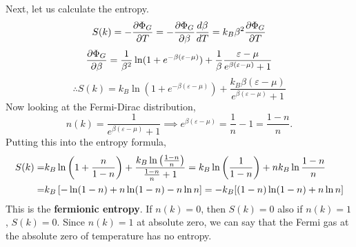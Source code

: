         Next, let us calculate the entropy.
        \begin{equation}
            S(k) = - \frac{\partial \Phi_G}{\partial T} = -\frac{\partial \Phi_G}{\partial \beta}\frac{d\beta}{dT}=k_B\beta^2 \frac{\partial \Phi_G}{\partial T}
        \end{equation}
        \begin{equation}
            \frac{\partial \Phi_G}{\partial \beta}=\frac{1}{\beta^2}\ln(1+e^{-\beta(\varepsilon-\mu)})+ \frac{1}{\beta}\frac{\varepsilon-\mu}{e^{\beta(\varepsilon-\mu)}+1}
        \end{equation}
        \begin{equation}
            \therefore S(k) = k_B\ln(1+e^{-\beta(\varepsilon-\mu)})+\frac{k_B\beta(\varepsilon-\mu)}{e^{\beta(\varepsilon-\mu)}+1}
        \end{equation}
        Now looking at the Fermi-Dirac distribution,
        \begin{equation}
            n(k) = \frac{1}{e^{\beta(\varepsilon-\mu)}+1}\implies e^{\beta(\varepsilon-\mu)}=\frac{1}{n}-1=\frac{1-n}{n}.
        \end{equation}
        Putting this into the entropy formula,
        \begin{align}
            S(k) =& k_B\ln\left( 1+\frac{n}{1-n} \right)+\frac{k_B\ln\left( \frac{1-n}{n} \right)}{\frac{1-n}{n}+1}=k_B\ln\left( \frac{1}{1-n} \right)+nk_B\ln\frac{1-n}{n} \notag\\
                =& k_B\left[ -\ln(1-n)+n\ln(1-n)-n\ln n \right] = -k_B[(1-n)\ln(1-n)+n\ln n]
        \end{align}
        This is the \textbf{fermionic entropy}. If $n(k)=0$, then $S(k)=0$ also if $n(k)=1$, $S(k)=0$. Since $n(k)=1$ at absolute zero, we can say that the Fermi gas at the absolute zero of temperature has no entropy. 
    

